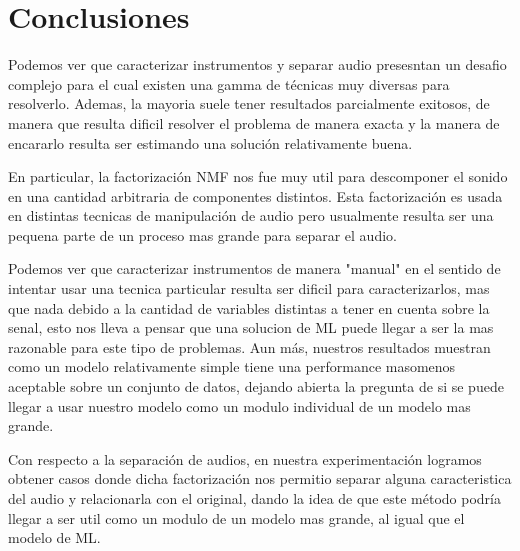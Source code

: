 \section{Conclusiones}

Podemos ver que caracterizar instrumentos y separar audio presesntan un desafio complejo para el cual existen una gamma de t\'ecnicas muy diversas para resolverlo. Ademas, la mayoria suele tener resultados parcialmente exitosos, de manera que resulta dificil resolver el problema de manera exacta y la manera de encararlo resulta ser estimando una soluci\'on relativamente buena.

En particular, la factorizaci\'on NMF nos fue muy util para descomponer el sonido en una cantidad arbitraria de componentes distintos. Esta factorizaci\'on es usada en distintas tecnicas de manipulaci\'on de audio pero usualmente resulta ser una pequena parte de un proceso mas grande para separar el audio.

Podemos ver que caracterizar instrumentos de manera "manual" en el sentido de intentar usar una tecnica particular resulta ser dificil para caracterizarlos, mas que nada debido a la cantidad de variables distintas a tener en cuenta sobre la senal, esto nos lleva a pensar que una solucion de ML puede llegar a ser la mas razonable para este tipo de problemas. Aun m\'as, nuestros resultados muestran como un modelo relativamente simple tiene una performance masomenos aceptable sobre un conjunto de datos, dejando abierta la pregunta de si se puede llegar a usar nuestro modelo como un modulo individual de un modelo mas grande.

Con respecto a la separaci\'on de audios, en nuestra experimentaci\'on logramos obtener casos donde dicha factorizaci\'on nos permitio separar alguna caracteristica del audio y relacionarla con el original, dando la idea de que este m\'etodo podr\'ia llegar a ser util como un modulo de un modelo mas grande, al igual que el modelo de ML.
